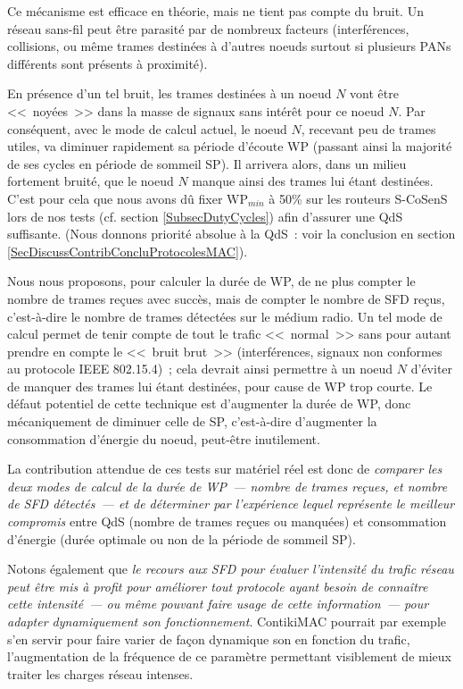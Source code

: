 \begin{enumerate}
\smallskip

Ce mécanisme est efficace en théorie, mais ne tient pas compte du bruit.
Un réseau sans-fil peut être parasité par de nombreux facteurs
(interférences, collisions, ou même trames destinées à d'autres noeuds
surtout si plusieurs PANs différents sont présents à proximité).

En présence d'un tel bruit, les trames destinées à un noeud $N$ vont
être <<~noyées~>> dans la masse de signaux sans intérêt pour ce noeud $N$.
Par conséquent, avec le mode de calcul actuel, le noeud $N$, recevant peu
de trames utiles, va diminuer rapidement sa période d'écoute WP (passant
ainsi la majorité de ses cycles en période de sommeil SP). Il arrivera
alors, dans un milieu fortement bruité, que le noeud $N$ manque ainsi
des trames lui étant destinées. C'est pour cela que nous avons dû fixer
$\mathrm{WP}_{min}$ à 50\% sur les routeurs S-CoSenS lors de nos tests
(cf. section \vref{SubsecDutyCycles}) afin d'assurer une QdS suffisante.
(Nous donnons priorité absolue à la QdS~: voir la conclusion en section
\vref{SecDiscussContribConcluProtocolesMAC}).

Nous nous proposons, pour calculer la durée de WP, de ne plus compter le
nombre de trames reçues avec succès, mais de compter le nombre de SFD reçus,
c'est-à-dire le nombre de trames détectées sur le médium radio. Un tel
mode de calcul permet de tenir compte de tout le trafic <<~normal~>>
sans pour autant prendre en compte le <<~bruit brut~>> (interférences,
signaux non conformes au protocole IEEE 802.15.4)~; cela devrait ainsi
permettre à un noeud $N$ d'éviter de manquer des trames lui étant
destinées, pour cause de WP trop courte. Le défaut potentiel de cette
technique est d'augmenter la durée de WP, donc mécaniquement de diminuer
celle de SP, c'est-à-dire d'augmenter la consommation d'énergie du noeud,
peut-être inutilement. 

La contribution attendue de ces tests sur matériel réel est donc de
\emph{comparer les deux modes de calcul de la durée de WP~--- nombre
de trames reçues, et nombre de SFD détectés~--- et de déterminer par
l'expérience lequel représente le meilleur compromis} entre QdS (nombre
de trames reçues ou manquées) et consommation d'énergie (durée optimale
ou non de la période de sommeil SP).

Notons également que \emph{le recours aux SFD pour évaluer l'intensité
du trafic réseau peut être mis à profit pour améliorer tout protocole
ayant besoin de connaître cette intensité~--- ou même pouvant faire usage
de cette information~--- pour adapter dynamiquement son fonctionnement}.
ContikiMAC pourrait par exemple s'en servir pour faire varier de façon
dynamique son  en fonction du trafic,
l'augmentation de la fréquence de ce paramètre permettant visiblement
de mieux traiter les charges réseau intenses.


\end{enumerate}
